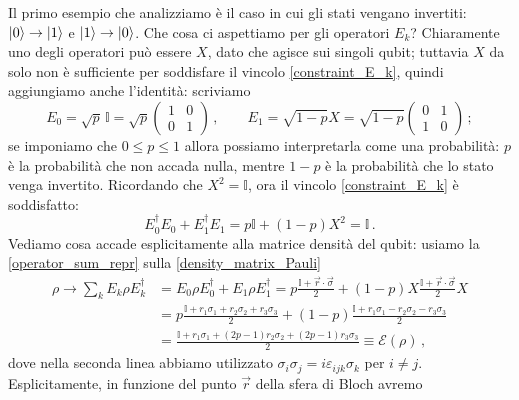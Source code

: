 \begin{esempio}
    Il primo esempio che analizziamo è il caso in cui gli stati vengano invertiti: $\ket{0} \rightarrow \ket{1}$ e $\ket{1} \rightarrow \ket{0}$. Che cosa ci aspettiamo per gli operatori $E_k$? Chiaramente uno degli operatori può essere $X$, dato che agisce sui singoli qubit; tuttavia $X$ da solo non è sufficiente per soddisfare il vincolo \eqref{constraint_E_k}, quindi aggiungiamo anche l'identità: scriviamo
    \begin{equation*}
        E_0 = \sqrt{p} \, \mathbb{I} = \sqrt{p}
        \begin{pmatrix}
            1 & 0 \\ 0 & 1
        \end{pmatrix} \, , \qquad
        E_1 = \sqrt{1-p} X = \sqrt{1-p}
        \begin{pmatrix}
            0 & 1 \\ 1 & 0
        \end{pmatrix} \, ;
    \end{equation*}
    se imponiamo che $0 \leq p \leq 1$ allora possiamo interpretarla come una probabilità: $p$ è la probabilità che non accada nulla, mentre $1-p$ è la probabilità che lo stato venga invertito. Ricordando che $X^2 = \mathbb{I}$, ora il vincolo \eqref{constraint_E_k} è soddisfatto:
    \begin{equation*}
        E_0^\dag E_0 + E_1^\dag E_1 = p \mathbb{I} + (1-p) X^2 = \mathbb{I} \, .
    \end{equation*}
    Vediamo cosa accade esplicitamente alla matrice densità del qubit: usiamo la \eqref{operator_sum_repr} sulla \eqref{density_matrix_Pauli}
    \begin{align*}
        \rho \rightarrow \sum_k E_k \rho E_k^\dag &= E_0 \rho E_0^\dag + E_1 \rho E_1^\dag = p \frac{\mathbb{I} + \vec{r} \cdot \vec{\sigma}}{2} + (1-p) X \frac{\mathbb{I} + \vec{r} \cdot \vec{\sigma}}{2} X \\
        &= p \frac{\mathbb{I} + r_1 \sigma_1 + r_2 \sigma_2 + r_3 \sigma_3}{2} + (1-p) \frac{\mathbb{I} + r_1 \sigma_1 - r_2 \sigma_2 - r_3 \sigma_3}{2} \\
        &= \frac{\mathbb{I} + r_1 \sigma_1 + (2p-1) r_2 \sigma_2 + (2p-1) r_3 \sigma_3}{2} \equiv \mathcal{E}(\rho) \, ,
    \end{align*}
    dove nella seconda linea abbiamo utilizzato $\sigma_i \sigma_j = i \varepsilon_{ijk} \sigma_k$ per $i \neq j$. Esplicitamente, in funzione del punto $\vec{r}$ della sfera di Bloch avremo

\end{esempio}
